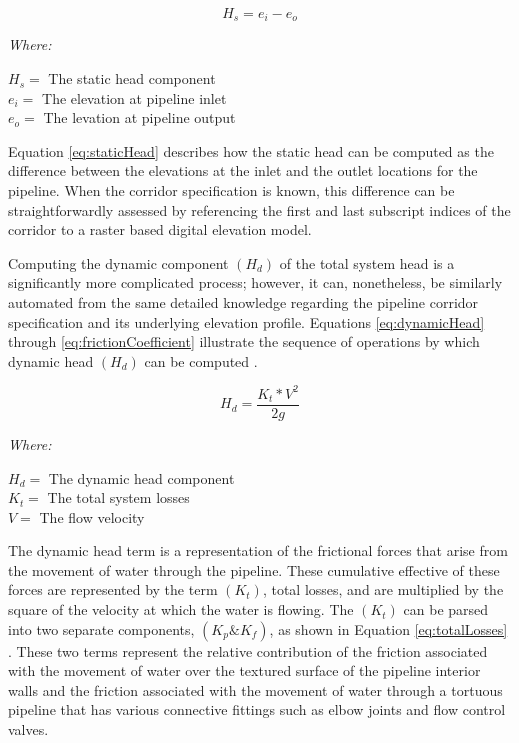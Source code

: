        \begin{equation}
          H_s = e_{i} - e_{o}  
          \label{eq:staticHead}
       \end{equation}
      
       \noindent \textit{Where:} \hfill

       \begin{center}
           $H_s = $ The static head component \\
           $e_i = $ The elevation at pipeline inlet \\
           $e_o = $ The levation at pipeline output \\
       \end{center}

Equation \ref{eq:staticHead} describes how the static head can be computed as the difference between the elevations at the inlet and the outlet locations for the pipeline. When the corridor specification is known, this difference can be straightforwardly assessed by referencing the first and last subscript indices of the corridor to a raster based digital elevation model.

Computing the dynamic component $(H_d)$ of the total system head is a significantly more complicated process; however, it can, nonetheless, be similarly automated from the same detailed knowledge regarding the pipeline corridor specification and its underlying elevation profile. Equations \ref{eq:dynamicHead} through \ref{eq:frictionCoefficient} illustrate the sequence of operations by which dynamic head $(H_d)$ can be computed \cite{Liu2003}. 

       \begin{equation}
          H_d = \frac{K_{t} * V^2}{2g}
          \label{eq:dynamicHead}
       \end{equation}
       
       \noindent \textit{Where:} \hfill
       
       \begin{center}
           $H_d = $ The dynamic head component \\
           $K_t = $ The total system losses \\
           $V = $ The flow velocity \\
       \end{center}
       
The dynamic head term is a representation of the frictional forces that arise from the movement of water through the pipeline. These cumulative effective of these forces are represented by the term $(K_t)$, total losses, and are multiplied by the square of the velocity at which the water is flowing. The $(K_t)$ can be parsed into two separate components, $(K_p \& K_f)$, as shown in Equation \ref{eq:totalLosses} \cite{Liu2003}. These two terms represent the relative contribution of the friction associated with the movement of water over the textured surface of the pipeline interior walls and the friction associated with the movement of water through a tortuous pipeline that has various connective fittings such as elbow joints and flow control valves. 

